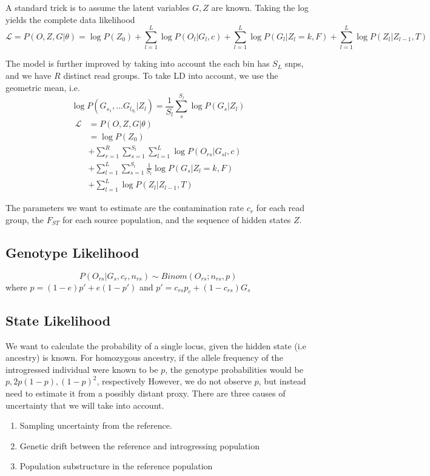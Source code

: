 \documentclass[10pt,a4paper]{article}
\begin{document}
A standard trick is to assume the latent variables $G, Z$ are known. Taking the log
yields the complete data likelihood
\begin{equation}
\mathcal{L}  = P(O, Z, G | \theta) = \log P(Z_0) 
+ \sum_{l=1}^L \log P(O_l | G_l, c)
+ \sum_{l=1}^L \log P(G_l | Z_l = k, F)
+ \sum_{l=1}^L  \log P(Z_l |Z_{l-1}, T) \label{eq:ll:simple}
\end{equation}

The model is further improved by taking into account the each bin has $S_L$ snps, and we have $R$ distinct read groups. To take LD into account, we use the geometric mean, i.e.
$$\log P(G_{s_1}, \dots G_{l_{S_l}}| Z_l) = \frac{1}{S_l}\sum_s^{S_l}\log P(G_{s} | Z_l)$$
\begin{align}
\mathcal{L}  &= P(O, Z, G | \theta)  \nonumber\\
&=\log P(Z_0) \nonumber\\
&+ \sum_{r=1}^R\sum_{s=1}^{S_l}\sum_{l=1}^L \log P(O_{rs} | G_{sl}, c)\nonumber\\
&+ \sum_{l=1}^L \sum_{s=1}^{S_l} \frac{1}{S_l}\log P(G_s | Z_l = k, F)\nonumber\\
&+ \sum_{l=1}^L  \log P(Z_l |Z_{l-1}, T) \label{eq:ll:correct}
\end{align}

The parameters we want to estimate are the contamination rate $c_r$ for each read group, the $F_{ST}$ for each source population, and the sequence of hidden states $Z$.

\subsection{Genotype Likelihood}
\begin{equation}
P(O_{rs}| G_s, c_r, n_{rs}) \sim Binom(O_{rs}; n_{rs}, p) \label{eq:ll:geno}
\end{equation}
where $p = (1-e) p' + e (1-p')$
and $p' =c_{rs} p_c + (1-c_{rs}) G_s$
\subsection{State Likelihood}
We want to calculate the probability of a single locus, given the hidden state (i.e ancestry) is known. For homozygous ancestry, if the allele frequency of the introgressed individual were known to be $p$, the genotype probabilities would be $p, 2p(1-p), (1-p)^2$, respectively However, we do not observe $p$, but instead need  to estimate it from a possibly distant proxy. There are three causes of uncertainty that we will take into account.
\begin{enumerate}
	\item Sampling uncertainty from the reference.	
	\item Genetic drift between the reference and introgressing population
	\item Population substructure in the reference population
\end{enumerate}
\end{document}
